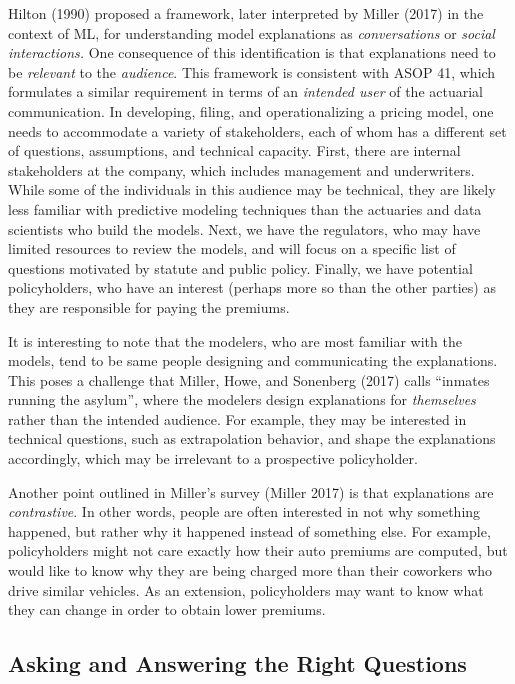 \documentclass[preprint, 3p, twocolumn, letterpaper, 10pt]{elsarticle} %
\begin{document}
Hilton (1990) proposed a framework, later interpreted by
Miller (2017) in the context of ML, for understanding model explanations
as \emph{conversations} or \emph{social interactions.} One consequence of this identification
is that explanations need to be \emph{relevant} to the \emph{audience}. This framework is
consistent with ASOP 41, which formulates a similar requirement in terms of an
\emph{intended user} of the actuarial communication. In developing,
filing, and operationalizing a pricing model, one needs to accommodate a variety
of stakeholders, each of whom has a different set of questions, assumptions,
and technical capacity. First, there are internal stakeholders at the company,
which includes management and underwriters. While some of the individuals in
this audience may be technical, they are likely less familiar with predictive
modeling techniques than the actuaries and data scientists who build the models.
Next, we have the regulators, who may have limited resources to review the
models, and will focus on a specific list of questions motivated by statute
and public policy. Finally, we have potential policyholders, who have an interest (perhaps
more so than the other parties) as they are responsible for paying the premiums.

It is interesting to note that the modelers, who are most familiar with the
models, tend to be same people designing and communicating the explanations.
This poses a challenge that Miller, Howe, and Sonenberg (2017) calls ``inmates running
the asylum'', where the modelers design explanations for \emph{themselves} rather
than the intended audience. For example, they may be interested in technical
questions, such as extrapolation behavior, and shape the explanations accordingly,
which may be irrelevant to a prospective policyholder.

Another point outlined in Miller's survey (Miller 2017) is
that explanations are \emph{contrastive}. In other words, people are often interested
in not why something happened, but rather why it happened instead of something
else. For example, policyholders might not care exactly how their auto premiums
are computed, but would like to know why they are being charged more than their
coworkers who drive similar vehicles. As an extension, policyholders may want
to know what they can change in order to obtain lower premiums.

\hypertarget{asking-and-answering-the-right-questions}{%
\subsection{Asking and Answering the Right Questions}\label{asking-and-answering-the-right-questions}}
\end{document}

